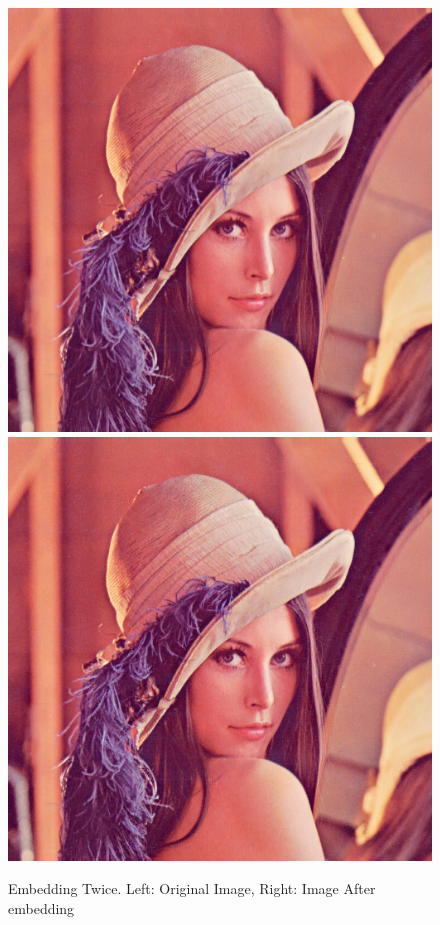 \documentclass[12pt]{article}
\begin{document}
\begin{figure}[h]
\centerline{%
\includegraphics[scale=0.45]{"lena"}%
\hspace{0.1cm}
\includegraphics[scale=0.45]{"Lena Embed twice 0.7 threshold/finalImage"}%
}%
\caption{Embedding Twice. Left: Original Image, Right: Image After embedding}
\label{fig:lenaEmbedTwiceEmbedding}
\end{figure}
\end{document}
